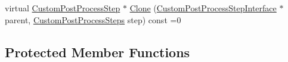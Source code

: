 \begin{DoxyCompactItemize}
\item 
virtual \mbox{\hyperlink{class_geometry_engine_1_1_custom_shading_1_1_custom_post_process_step}{Custom\+Post\+Process\+Step}} $\ast$ \mbox{\hyperlink{class_geometry_engine_1_1_custom_shading_1_1_custom_post_process_step_af4f29e24fd6b7f13d211f3f3effe40eb}{Clone}} (\mbox{\hyperlink{class_geometry_engine_1_1_custom_shading_1_1_custom_post_process_step_interface}{Custom\+Post\+Process\+Step\+Interface}} $\ast$parent, \mbox{\hyperlink{namespace_geometry_engine_1_1_custom_shading_a09e44ca81de5fe08c6d50271d680c4b1}{Custom\+Post\+Process\+Steps}} step) const =0
\end{DoxyCompactItemize}
\subsection*{Protected Member Functions}
